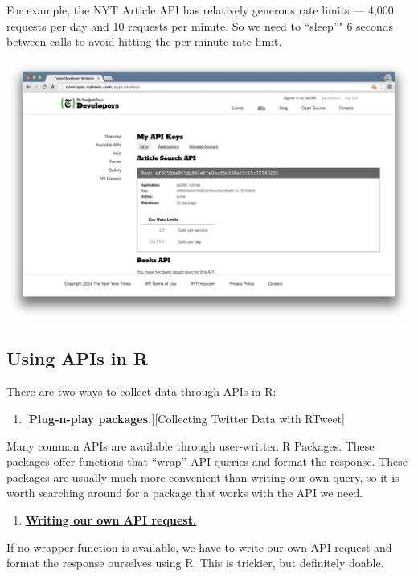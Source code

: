 \documentclass[]{book}
\providecommand{\tightlist}{%
  \setlength{\itemsep}{0pt}\setlength{\parskip}{0pt}}
\begin{document}
For example, the NYT Article API has relatively generous rate limits ---
4,000 requests per day and 10 requests per minute. So we need to
``sleep''" 6 seconds between calls to avoid hitting the per minute rate
limit.

\begin{center}\includegraphics[width=0.7\linewidth]{img/nytimes_key} \end{center}

\subsection{Using APIs in R}\label{using-apis-in-r}

There are two ways to collect data through APIs in R:

\begin{enumerate}
\def\labelenumi{\arabic{enumi}.}
\tightlist
\item
  {[}\textbf{Plug-n-play packages.}{]}{[}Collecting Twitter Data with
  RTweet{]}
\end{enumerate}

Many common APIs are available through user-written R Packages. These
packages offer functions that ``wrap'' API queries and format the
response. These packages are usually much more convenient than writing
our own query, so it is worth searching around for a package that works
with the API we need.

\begin{enumerate}
\def\labelenumi{\arabic{enumi}.}
\setcounter{enumi}{1}
\tightlist
\item
  \protect\hyperlink{writing-api-queries}{\textbf{Writing our own API
  request.}}
\end{enumerate}

If no wrapper function is available, we have to write our own API
request and format the response ourselves using R. This is trickier, but
definitely doable.
\end{document}

